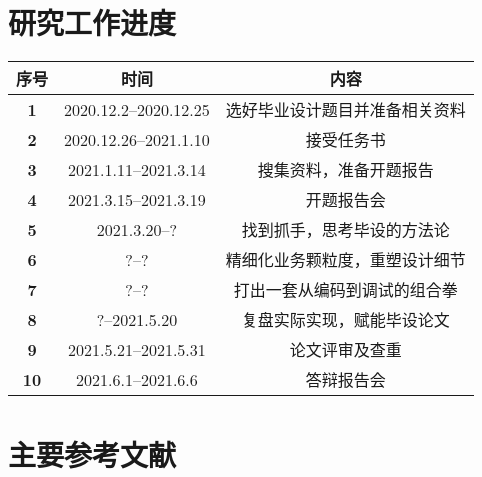 \documentclass{HDU-Bachelor-Thesis-Proposal}
\begin{document}
\clearpage
\section{研究工作进度}

\begin{table}[h]%
	\centering
	\begin{tabular}{| c | c | c |}%
    \hline
	\bfseries 序号 & \bfseries 时间 & \bfseries 内容 \\ \hline
	\bfseries 1 & 2020.12.2--2020.12.25 & 选好毕业设计题目并准备相关资料 \\ \hline
	\bfseries 2 & 2020.12.26--2021.1.10 & 接受任务书 \\ \hline
    \bfseries 3 & 2021.1.11--2021.3.14 & 搜集资料，准备开题报告 \\ \hline
	\bfseries 4 & 2021.3.15--2021.3.19 & 开题报告会 \\ \hline
    \bfseries 5 & 2021.3.20--? & 找到抓手，思考毕设的方法论 \\ \hline
	\bfseries 6 & ?--? & 精细化业务颗粒度，重塑设计细节 \\ \hline
    \bfseries 7 & ?--? & 打出一套从编码到调试的组合拳 \\ \hline
	\bfseries 8 & ?--2021.5.20 & 复盘实际实现，赋能毕设论文 \\ \hline
    \bfseries 9 & 2021.5.21--2021.5.31 & 论文评审及查重 \\ \hline
	\bfseries 10 & 2021.6.1--2021.6.6 & 答辩报告会 \\ \hline
    \end{tabular}
\end{table}

\section{主要参考文献}
\printbibliography[heading=none]

\makeassessment
\end{document}
